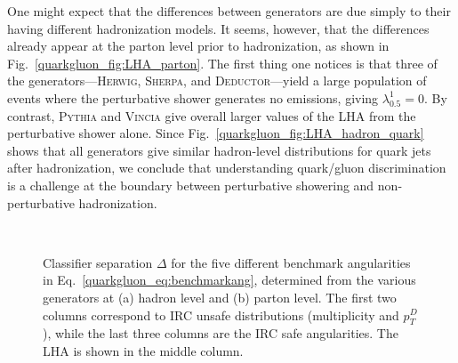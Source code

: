 \documentclass[11pt]{cernrep}
\begin{document}
One might expect that the differences between generators are due simply to their having different hadronization models.  It seems, however, that the differences already appear at the parton level prior to hadronization, as shown in Fig.~\ref{quarkgluon_fig:LHA_parton}.  The first thing one notices is that three of the generators---\textsc{Herwig}, \textsc{Sherpa}, and  \textsc{Deductor}---yield a large population of events where the perturbative shower generates no emissions, giving $\lambda_{0.5}^1 = 0$.  By contrast, \textsc{Pythia} and \textsc{Vincia} give overall larger values of the LHA from the perturbative shower alone.  Since Fig.~\ref{quarkgluon_fig:LHA_hadron_quark} shows that all generators give similar hadron-level distributions for quark jets after hadronization, we conclude that understanding quark/gluon discrimination is a challenge at the boundary between perturbative showering and non-perturbative hadronization.

\begin{figure}
\centering
{}
$\qquad$
\caption{Classifier separation $\Delta$ for the five different benchmark angularities in Eq.~\eqref{quarkgluon_eq:benchmarkang}, determined from the various generators at (a) hadron level and (b) parton level.  The first two columns correspond to IRC unsafe distributions (multiplicity and $p_T^D$), while the last three columns are the IRC safe angularities.  The LHA is shown in the middle column.}
\label{quarkgluon_fig:summary_hadron_all}
\end{figure}
\end{document}
